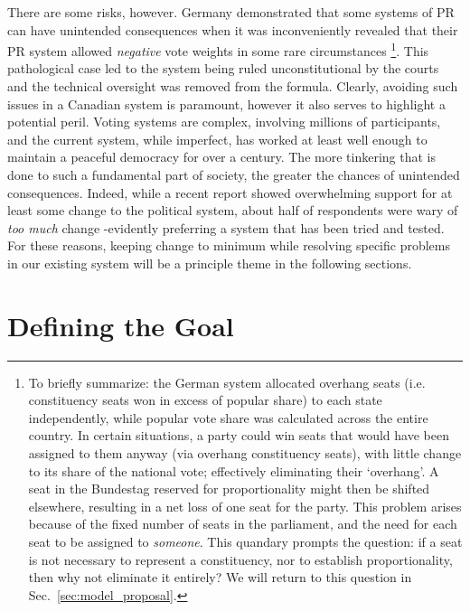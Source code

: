 \documentclass[DIV=calc, paper=a4, fontsize=11pt, twocolumn]{scrartcl}	 %
\begin{document}
There are some risks, however. Germany demonstrated that some systems of PR can have unintended consequences when it was inconveniently revealed that their PR system allowed \emph{negative} vote weights in some rare circumstances\cite{Die_Zeit_negative_vote} 
\footnote
{
To briefly summarize: the German system allocated overhang seats (i.e. constituency seats won in excess of popular share) to each state independently, while popular vote share was calculated across the entire country.
In certain situations, a party could win seats that would have been assigned to them anyway (via overhang constituency seats), with little change to its share of the national vote; effectively eliminating their `overhang'. A seat in the Bundestag reserved for proportionality might then be shifted elsewhere, resulting in a net loss of one seat for the party.
This problem arises because of the fixed number of seats in the parliament, and the need for each seat to be assigned to \emph{someone}. This quandary prompts the question: if a seat is not necessary to represent a constituency, nor to establish proportionality, then why not eliminate it entirely? We will return to this question in Sec.~\ref{sec:model_proposal}.
}.
This pathological case led to the system being ruled unconstitutional by the courts and the technical oversight was removed from the formula. 
Clearly, avoiding such issues in a Canadian system is paramount, however it also serves to highlight a potential peril.
Voting systems are complex, involving millions of participants, and the current system, while imperfect, has worked at least well enough to maintain a peaceful democracy for over a century. The more tinkering that is done to such a fundamental part of society, the greater the chances of unintended consequences. 
Indeed, while a recent report\cite{Broadbent_poll} showed overwhelming support for at least some change to the political system, about half of respondents were wary of \emph{too much} change \--evidently preferring a system that has been tried and tested. For these reasons, keeping change to minimum while resolving specific problems in our existing system will be a principle theme in the following sections.


\section{Defining the Goal}
\label{sec:goal_list}
\end{document}
